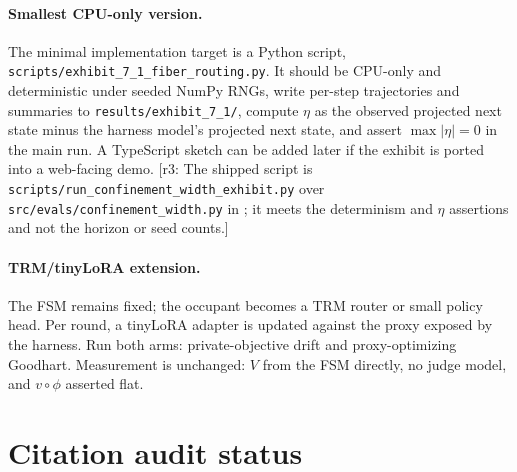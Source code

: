 \documentclass[11pt]{article}
\theoremstyle{definition}
\theoremstyle{remark}
\newcommand{\revnote}[1]{\textcolor{red!60!black}{[r3: #1]}}
\begin{document}
\paragraph{Smallest CPU-only version.} The minimal implementation target is a Python script, \texttt{scripts/\allowbreak exhibit\_7\_1\_\allowbreak fiber\_routing.py}. It should be CPU-only and deterministic under seeded NumPy RNGs, write per-step trajectories and summaries to \texttt{results/exhibit\_7\_1/}, compute $\eta$ as the observed projected next state minus the harness model's projected next state, and assert $\max|\eta|=0$ in the main run. A TypeScript sketch can be added later if the exhibit is ported into a web-facing demo. \revnote{The shipped script is \texttt{scripts/run\_\allowbreak confinement\_\allowbreak width\_\allowbreak exhibit.py} over \texttt{src/evals/\allowbreak confinement\_\allowbreak width.py} in \cite{dugan2026harness}; it meets the determinism and $\eta$ assertions and not the horizon or seed counts.}

\paragraph{TRM/tinyLoRA extension.} The FSM remains fixed; the occupant becomes a TRM router or small policy head. Per round, a tinyLoRA adapter is updated against the proxy exposed by the harness. Run both arms: private-objective drift and proxy-optimizing Goodhart. Measurement is unchanged: $V$ from the FSM directly, no judge model, and $v\circ\phi$ asserted flat.

\section{Citation audit status}
\end{document}
